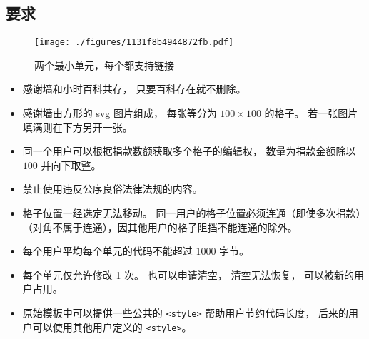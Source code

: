
\subsection{要求}

\begin{figure}[ht]
\centering
\texttt{[image: ./figures/1131f8b4944872fb.pdf]}
\caption{两个最小单元，每个都支持链接} \label{fig_thanks_1}
\end{figure}

\begin{itemize}
\item 感谢墙和小时百科共存， 只要百科存在就不删除。
\item 感谢墙由方形的 svg 图片组成， 每张等分为 $100\times 100$ 的格子。 若一张图片填满则在下方另开一张。
\item 同一个用户可以根据捐款数额获取多个格子的编辑权， 数量为捐款金额除以 $100$ 并向下取整。
\item 禁止使用违反公序良俗法律法规的内容。
\item 格子位置一经选定无法移动。 同一用户的格子位置必须连通（即使多次捐款）（对角不属于连通），因其他用户的格子阻挡不能连通的除外。
\item 每个用户平均每个单元的代码不能超过 1000 字节。
\item 每个单元仅允许修改 1 次。 也可以申请清空， 清空无法恢复， 可以被新的用户占用。
\item 原始模板中可以提供一些公共的 \verb`<style>` 帮助用户节约代码长度， 后来的用户可以使用其他用户定义的 \verb`<style>`。
\end{itemize}

